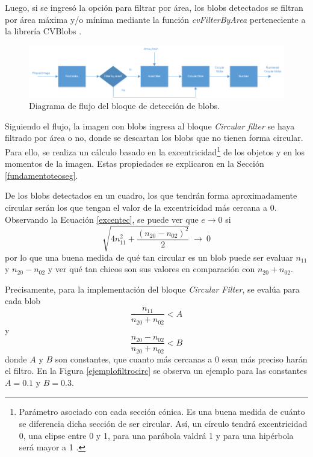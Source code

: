 Luego, si se ingresó la opción para filtrar por área, los blobs \cite{defBlob} detectados se filtran por área máxima y/o mínima mediante la función \emph{cvFilterByArea} perteneciente a la librería CVBlobs \cite{cvblob}. 

\begin{figure}[ht!]
\hspace{-1.5cm}
\includegraphics[scale=0.7]{img/detectBlobs_diagrama.png}
\caption{Diagrama de flujo del bloque de detección de blobs.}
\label{diagramadetectblobs}
\end{figure}

Siguiendo el flujo, la imagen con blobs ingresa al bloque \emph{Circular filter} se haya filtrado por área o no, donde se descartan los blobs que no tienen forma circular. Para ello, se realiza un cálculo basado en la excentricidad\footnote{Parámetro asociado con cada sección cónica. Es una buena medida de cuánto se diferencia dicha sección de ser circular. Así, un círculo tendrá excentricidad 0, una elipse entre 0 y 1, para una parábola valdrá 1 y para una hipérbola será mayor a 1 \cite{excentricidad}. } de los objetos y en los momentos de la imagen. Estas propiedades se explicaron en la Sección \ref{fundamentoteoseg}.

De los blobs detectados en un cuadro, los que tendrán forma aproximadamente circular serán los que tengan el valor de la excentricidad más cercana a $0$. Observando la Ecuación \ref{excentec}, se puede ver que $e{\rightarrow}0$ si $$\sqrt{4n_{11}^2+\frac{(n_{20}-n_{02})^2}{2}}\ {\rightarrow}\ 0$$ por lo que una buena medida de qué tan circular es un blob puede ser evaluar $n_{11}$ y $n_{20}-n_{02}$ y ver qué tan chicos son sus valores en comparación con $n_{20}+n_{02}$.

Precisamente, para la implementación del bloque \emph{Circular Filter}, se evalúa para cada blob $$\frac{n_{11}}{n_{20}+n_{02}}< A$$ y $$\frac{n_{20}-n_{02}}{n_{20}+n_{02}}< B$$ donde $A$ y $B$ son constantes, que cuanto más cercanas a $0$ sean más preciso harán el filtro. En la Figura \ref{ejemplofiltrocirc} se observa un ejemplo para las constantes $A = 0.1$ y $B = 0.3$.

